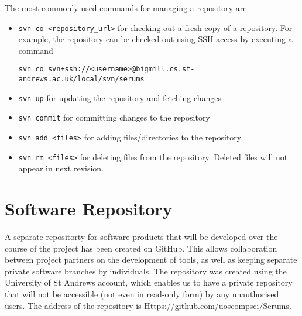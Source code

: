 The most commonly used commands for managing a repository are
\begin{itemize}
\item \lstinline{svn co <repository_url>} for checking out a fresh copy  of a repository. For example, the \Serums{} repository can be checked out using
SSH access by executing a command

\begin{lstlisting}[basicstyle=\small]
svn co svn+ssh://<username>@bigmill.cs.st-andrews.ac.uk/local/svn/serums
\end{lstlisting}

\item \lstinline{svn up} for updating the repository and fetching changes
\item \lstinline{svn commit} for committing changes to the repository
\item \lstinline{svn add <files>} for adding files/directories to the repository
\item \lstinline{svn rm <files>} for deleting files from the repository. Deleted files will not appear in next revision.
\end{itemize}

\section{Software Repository}

A separate repositorty 
for software products that will be developed over the
course of the project has been created on GitHub. This allows collaboration
between project partners on the development of tools, as well as keeping
separate private software branches by individuals. The repository was created using the
University of St Andrews account, which enables us to have a private repository that will
not be accessible (not even in read-only form) by any unauthorised users. The address of the repository is
\url{Https://github.com/uoscompsci/Serums}.

